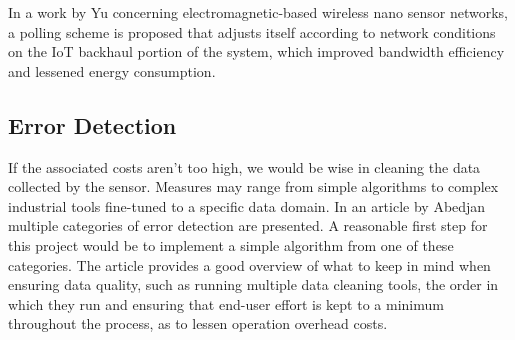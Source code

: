 In a work by Yu \etal \cite{nanonetworks} concerning electromagnetic-based wireless nano sensor networks, a polling scheme is proposed that adjusts itself according to network conditions on the IoT backhaul portion of the system, which improved bandwidth efficiency and lessened energy consumption. 

\subsection{Error Detection}
If the associated costs aren't too high, we would be wise in cleaning the data collected by the sensor. Measures may range from simple algorithms to complex industrial tools fine-tuned to a specific data domain. In an article by Abedjan \etal \cite{data-errors} multiple categories of error detection are presented. A reasonable first step for this project would be to implement a simple algorithm from one of these categories. The article provides a good overview of what to keep in mind when ensuring data quality, such as running multiple data cleaning tools, the order in which they run and ensuring that end-user effort is kept to a minimum throughout the process, as to lessen operation overhead costs.




